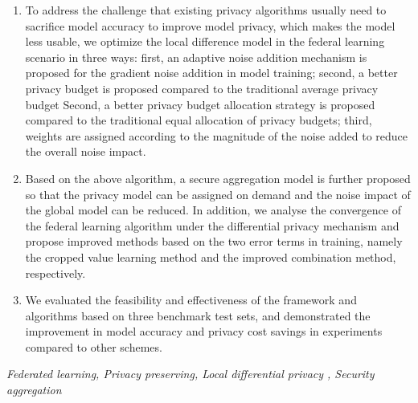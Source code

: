 \begin{enumerate}
	\item To address the challenge that existing privacy algorithms usually need to sacrifice model accuracy to improve model privacy, which makes the model less usable, we optimize the local difference model in the federal learning scenario in three ways: first, an adaptive noise addition mechanism is proposed for the gradient noise addition in model training; second, a better privacy budget is proposed compared to the traditional average privacy budget Second, a better privacy budget allocation strategy is proposed compared to the traditional equal allocation of privacy budgets; third, weights are assigned according to the magnitude of the noise added to reduce the overall noise impact.
	\item Based on the above algorithm, a secure aggregation model is further proposed so that the privacy model can be assigned on demand and the noise impact of the global model can be reduced. In addition, we analyse the convergence of the federal learning algorithm under the differential privacy mechanism and propose improved methods based on the two error terms in training, namely the cropped value learning method and the improved combination method, respectively.
	\item We evaluated the feasibility and effectiveness of the framework and algorithms based on three benchmark test sets, and demonstrated the improvement in model accuracy and privacy cost savings in experiments compared to other schemes.
\end{enumerate}
{} \textit{Federated learning, Privacy preserving, Local differential privacy , Security aggregation}


